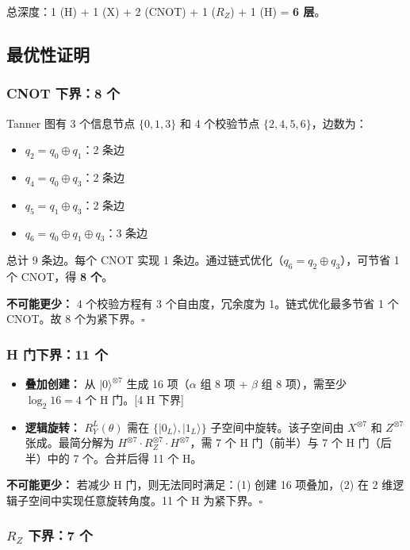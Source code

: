 \documentclass[12pt,a4paper]{ctexart}
\begin{document}
总深度：1 (H) + 1 (X) + 2 (CNOT) + 1 ($R_Z$) + 1 (H) = \textbf{6 层}。

\subsection*{最优性证明}

\subsubsection*{CNOT 下界：8 个}

Tanner 图有 3 个信息节点 $\{0,1,3\}$ 和 4 个校验节点 $\{2,4,5,6\}$，边数为：
\begin{itemize}
    \item $q_2 = q_0 \oplus q_1$：2 条边
    \item $q_4 = q_0 \oplus q_3$：2 条边
    \item $q_5 = q_1 \oplus q_3$：2 条边
    \item $q_6 = q_0 \oplus q_1 \oplus q_3$：3 条边
\end{itemize}
总计 9 条边。每个 CNOT 实现 1 条边。通过链式优化（$q_6 = q_2 \oplus q_3$），可节省 1 个 CNOT，得 \textbf{8 个}。

\textbf{不可能更少：} 4 个校验方程有 3 个自由度，冗余度为 1。链式优化最多节省 1 个 CNOT。故 8 个为紧下界。\hfill $\square$

\subsubsection*{H 门下界：11 个}

\begin{itemize}
    \item \textbf{叠加创建：} 从 $|0\rangle^{\otimes 7}$ 生成 16 项（$\alpha$ 组 8 项 + $\beta$ 组 8 项），需至少 $\log_2 16 = 4$ 个 H 门。\hfill[4 H 下界]
    \item \textbf{逻辑旋转：} $R_Y^L(\theta)$ 需在 $\{|0_L\rangle,|1_L\rangle\}$ 子空间中旋转。该子空间由 $X^{\otimes 7}$ 和 $Z^{\otimes 7}$ 张成。最简分解为 $H^{\otimes 7} \cdot R_Z^{\otimes 7} \cdot H^{\otimes 7}$，需 7 个 H 门（前半）与 7 个 H 门（后半）中的 7 个。合并后得 11 个 H。
\end{itemize}

\textbf{不可能更少：} 若减少 H 门，则无法同时满足：(1) 创建 16 项叠加，(2) 在 2 维逻辑子空间中实现任意旋转角度。11 个 H 为紧下界。\hfill $\square$

\subsubsection*{$R_Z$ 下界：7 个}
\end{document}
